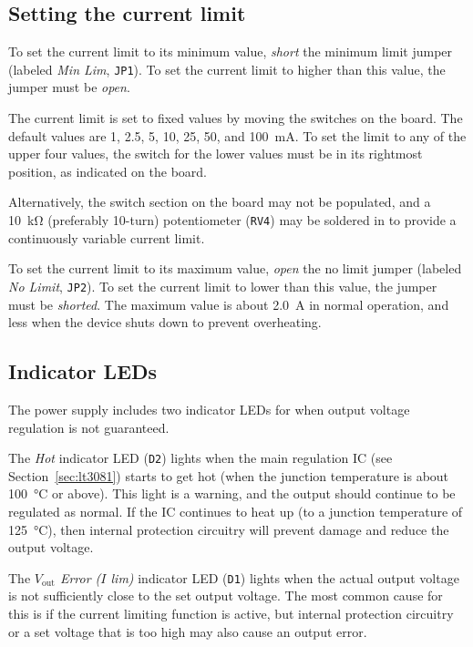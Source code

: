 \documentclass[letterpaper,twocolumn,10pt]{article}
\newcommand{\refdes}[1]{\texttt{#1}}
\begin{document}
\subsection{Setting the current limit}\label{sec:set_limit}

To set the current limit to its minimum value, \emph{short} the minimum limit
jumper (labeled \emph{Min Lim}, \refdes{JP1}). To set the current limit to
higher than this value, the jumper must be \emph{open}.

The current limit is set to fixed values by moving the switches on the
board. The default values are 1, 2.5, 5, 10, 25, 50, and \SI{100}{\mA}. To set
the limit to any of the upper four values, the switch for the lower values must
be in its rightmost position, as indicated on the board.

Alternatively, the switch section on the board may not be populated, and a
\SI{10}{\kohm} (preferably 10-turn) potentiometer (\refdes{RV4}) may be
soldered in to provide a continuously variable current limit.

To set the current limit to its maximum value, \emph{open} the no limit jumper
(labeled \emph{No Limit}, \refdes{JP2}). To set the current limit to lower than
this value, the jumper must be \emph{shorted}. The maximum value is about
\SI{2.0}{\A} in normal operation, and less when the device shuts down to prevent
overheating.

\subsection{Indicator LEDs}

The power supply includes two indicator LEDs for when output voltage regulation
is not guaranteed.

The \textit{Hot} indicator LED (\refdes{D2}) lights when the main regulation IC
(see Section~\ref{sec:lt3081}) starts to get hot (when the junction temperature
is about \SI{100}{\celsius} or above). This light is a warning, and the output
should continue to be regulated as normal. If the IC continues to heat up (to a
junction temperature of \SI{125}{\celsius}), then internal protection circuitry
will prevent damage and reduce the output voltage.

The \textit{$V_\text{out}$ Error ($I$ lim)} indicator LED (\refdes{D1}) lights
when the actual output voltage is not sufficiently close to the set output
voltage. The most common cause for this is if the current limiting function is
active, but internal protection circuitry or a set voltage that is too high may
also cause an output error.
\end{document}
